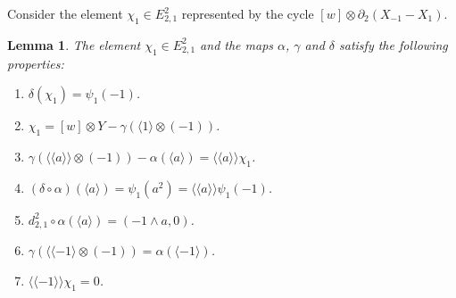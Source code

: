 \documentclass[11pt]{amsart}
\theoremstyle{definition}
\theoremstyle{plain}
\newtheorem{lem}[ntn]{Lemma}
\numberwithin{equation}{section}
\newcommand{\lan}{\langle}
\newcommand{\ran}{\rangle}
\newcommand{\Lan}{\langle \! \langle}
\newcommand{\Ran}{\rangle \! \rangle}
\begin{document}
Consider the element $\chi_1\in E^2_{2,1}$ represented by the cycle $[w]\otimes\partial_2(X_{-1}-X_1)$.
\begin{lem}\label{alpha-gam-chi}
    The element $\chi_1\in E^2_{2,1}$ and the maps $\alpha$, $\gamma$ and $\delta$ satisfy the following properties:
    \begin{enumerate}
        \item $\delta(\chi_1)=\psi_1(-1)$.
        \item $\chi_1=[w]\otimes Y-\gamma(\lan 1\ran\otimes (-1))$.
        \item $\gamma(\Lan a\Ran\otimes (-1))-\alpha(\lan a\ran)=\Lan a\Ran\chi_1$.
        \item $(\delta\circ\alpha)(\lan a\ran)=\psi_1(a^2)=\Lan a\Ran\psi_1(-1)$.
        \item $d^2_{2,1}\circ\alpha(\lan a\ran)=(-1\wedge a,0)$.
        \item $\gamma(\Lan -1\ran\otimes(-1))=\alpha(\lan -1\ran)$.
        \item $\Lan -1\Ran\chi_1=0$.
    \end{enumerate} 
\end{lem}
\end{document}
